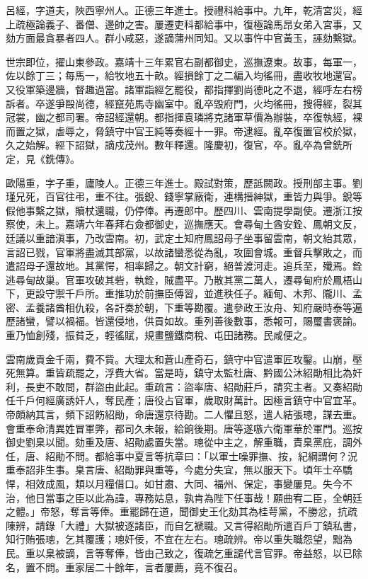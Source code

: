 \begin{pinyinscope}
呂經，字道夫，陜西寧州人。正德三年進士。授禮科給事中。九年，乾清宮災，經上疏極論義子、番僧、邊帥之害。屢遷吏科都給事中，復極論馬昂女弟入宮事，又劾方面最貪暴者四人。群小咸惡，遂謫蒲州同知。又以事忤中官黃玉，誣劾繫獄。

世宗即位，擢山東參政。嘉靖十三年累官右副都御史，巡撫遼東。故事，每軍一，佐以餘丁三；每馬一，給牧地五十畝。經損餘丁之二編入均徭冊，盡收牧地還官。又役軍築邊牆，督趣過當。諸軍詣經乞罷役，都指揮劉尚德叱之不退，經呼左右榜訴者。卒遂爭毆尚德，經竄苑馬寺幽室中。亂卒毀府門，火均徭冊，搜得經，裂其冠裳，幽之都司署。帝詔經還朝。都指揮袁璘將克諸軍草價為辦裝，卒復執經，裸而置之獄，虐辱之，脅鎮守中官王純等奏經十一罪。帝逮經。亂卒復置官校於獄，久之始解。經下詔獄，謫戍茂州。數年釋還。隆慶初，復官，卒。亂卒為曾銑所定，見《銑傳》。

歐陽重，字子重，廬陵人。正德三年進士。殿試對策，歷詆闕政。授刑部主事。劉瑾兄死，百官往弔，重不往。張銳、錢寧掌廠衛，連構搢紳獄，重皆力與爭。銳等假他事繫之獄，贖杖還職，仍停俸。再遷郎中。歷四川、雲南提學副使。遷浙江按察使，未上。嘉靖六年春拜右僉都御史，巡撫應天。會尋甸土酋安銓、鳳朝文反，廷議以重諳滇事，乃改雲南。初，武定土知府鳳詔母子坐事留雲南，朝文紿其眾，言詔已戮，官軍將盡滅其部黨，以故諸蠻悉從為亂，攻圍會城。重督兵擊敗之，而遣詔母子還故地。其黨愕，相率歸之。朝文計窮，絕普渡河走。追兵至，殲焉。銓逃尋甸故巢。官軍攻破其砦，執銓，賊盡平。乃散其黨二萬人，遷尋甸府於鳳梧山下，更設守禦千戶所。重推功於前撫臣傅習，並進秩任子。緬甸、木邦、隴川、孟密、孟養諸酋相仇殺，各訐奏於朝，下重等勘覆。遣參政王汝舟、知府嚴時泰等遍歷諸蠻，譬以禍福。皆還侵地，供貢如故。重列善後數事，悉報可，賜璽書褒諭。重乃恤創殘，振貧乏，輕徭賦，規畫鹽鐵商稅、屯田諸務。民咸便之。

雲南歲貢金千兩，費不貲。大理太和蒼山產奇石，鎮守中官遣軍匠攻鑿。山崩，壓死無算。重皆疏罷之，浮費大省。當是時，鎮守太監杜唐、黔國公沐紹勛相比為奸利，長吏不敢問，群盜由此起。重疏言：盜率唐、紹勛莊戶，請究主者。又奏紹勛任千戶何經廣誘奸人，奪民產；唐役占官軍，歲取財萬計。因極言鎮守中官宜革。帝頗納其言，頻下詔飭紹勛，命唐還京待勘。二人懼且怒，遣人結張璁，謀去重。會重奉命清異姓冒軍弊，都司久未報，給餉後期。唐等遂嗾六衛軍華於軍門。巡按御史劉臬以聞。劾重及唐、紹勛處置失當。璁從中主之，解重職，責臬黨庇，調外任，唐、紹勛不問。都給事中夏言等抗章曰：「以軍士噪罪撫、按，紀綱謂何？況重奉詔非生事。臬言唐、紹勛罪與重等，今處分失宜，無以服天下。頃年士卒驕悍，相效成風，類以月糧借口。如甘肅、大同、福州、保定，事變屢見。失今不治，他日當事之臣以此為諱，專務姑息，孰肯為陛下任事哉！願曲宥二臣，全朝廷之體。」帝怒，奪言等俸。重罷歸在道，聞御史王化劾其為桂萼黨，不勝忿，抗疏陳辨，請錄「大禮」大獄被逐諸臣，而自乞褫職。又言得紹勛所遣百戶丁鎮私書，知行賄張璁，乞其覆護；璁奸佞，不宜在左右。璁疏辨。帝以重失職怨望，黜為民。重以臬被謫，言等奪俸，皆由己致之，復疏乞重譴代言官罪。帝益怒，以已除名，置不問。重家居二十餘年，言者屢薦，竟不復召。


\end{pinyinscope}
